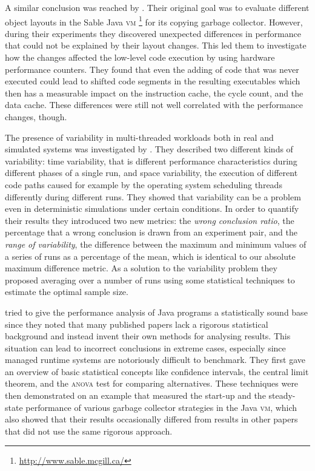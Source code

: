 A similar conclusion was reached by \citet{gu_code_2004}. Their original goal
was to evaluate different object layouts in the Sable Java \textsc{vm}%
\footnote{\url{http://www.sable.mcgill.ca/}} for its copying garbage
collector. However, during their experiments they discovered unexpected
differences in performance that could not be explained by their layout
changes. This led them to investigate how the changes affected the low-level
code execution by using hardware performance counters. They found that even
the adding of code that was never executed could lead to shifted code segments
in the resulting executables which then has a measurable impact on the
instruction cache, the cycle count, and the data cache. These differences were
still not well correlated with the performance changes, though.

The presence of variability in multi-threaded workloads both in real and
simulated systems was investigated by \citet{alameldeen_variability_2003}.
They described two different kinds of variability: time variability, that is
different performance characteristics during different phases of a single run,
and space variability, the execution of different code paths caused for
example by the operating system scheduling threads differently during
different runs. They showed that variability can be a problem even in
deterministic simulations under certain conditions. In order to quantify their
results they introduced two new metrics: the \emph{wrong conclusion ratio},
the percentage that a wrong conclusion is drawn from an experiment pair, and
the \emph{range of variability}, the difference between the maximum and
minimum values of a series of runs as a percentage of the mean, which is
identical to our absolute maximum difference metric. As a solution to the
variability problem they proposed averaging over a number of runs using some
statistical techniques to estimate the optimal sample size.

\citet{georges_statistically_2007} tried to give the performance analysis of
Java programs a statistically sound base since they noted that many published
papers lack a rigorous statistical background and instead invent their own
methods for analysing results. This situation can lead to incorrect
conclusions in extreme cases, especially since managed runtime systems are
notoriously difficult to benchmark. They first gave an overview of basic
statistical concepts like confidence intervals, the central limit theorem, and
the \textsc{anova} test for comparing alternatives. These techniques were then
demonstrated on an example that measured the start-up and the steady-state
performance of various garbage collector strategies in the Java \textsc{vm},
which also showed that their results occasionally differed from results in
other papers that did not use the same rigorous approach.

